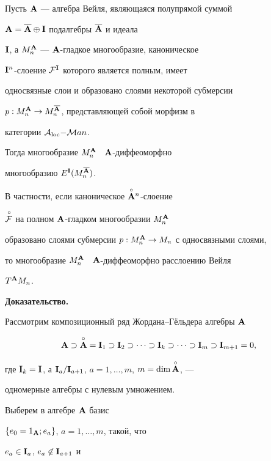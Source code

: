 \begin{thm}


Пусть ${\bold A}$ --- алгебра Вейля, являющаяся полупрямой суммой


${\bold A}=\overline{{\bold A}}\oplus{\bold I}$ подалгебры $\overline{{\bold A}}$ и идеала


${\bold I}$, а $M^{\bold A}_n$ --- ${\bold A}$-гладкое многообразие, каноническое


${\bold I}^n$-слоение ${\cal F}^{{\bold I}}$ которого является полным, имеет


односвязные слои и образовано слоями некоторой субмерсии


$p:M_n^{\bold A}\to M_n^{\overline{{\bold A}}}$, представляющей собой морфизм в


категории ${\cal A}_{\operatorname{loc}}{-}{\cal M}an$.


Тогда многообразие $M_n^{\bold A}$ \ ${\bold A}$-диффеоморфно


многообразию $E^{\bold I}(M_n^{\overline{{\bold A}}})$.


 


В частности, если каноническое $\overset{\circ}{{\bold A}}{}^n$-слоение


$\overset{\,\circ}{\cal F}{}$ на полном ${\bold A}$-гладком многообразии $M^{\bold A}_n$


образовано слоями субмерсии $p:M^{\bold A}_n\to M_n$ с односвязными слоями,


то многообразие $M^{\bold A}_n$ \ ${\bold A}$-диффеоморфно расслоению Вейля


$T^{\bold A} M_n$.


\end{thm}





 


{\bf Доказательство.}


Рассмотрим композиционный ряд Жордана--Г\"ельдера алгебры ${\bold A}$ \cite{Pier}


$$


\A\supset{\Ao}=\I_1\supset\I_2\supset\dotsb\supset


\I_k\supset \dotsb \supset \I_m \supset \I_{m+1}=0,


$$


где ${\bold I}_k={\bold I}$, а ${\bold I}_a/{\bold I}_{a+1}$, $a=1,\dotsc, m$, $m=\dim \overset{\circ}{\bold A}{}$, ---


одномерные алгебры с нулевым умножением.


Выберем в алгебре ${\bold A}$ базис


$\{e_0=1_{\bold A};e_ a\}$, $a=1,\dotsc,m$, такой, что


$e_ a\in {{\bold I}}_a$, $e_a\not\in{{\bold I}}_{a+1}$ и


